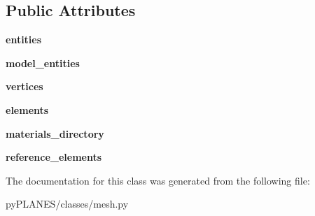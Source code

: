 \subsection*{Public Attributes}
\begin{DoxyCompactItemize}
\item 
\mbox{\label{classpy_p_l_a_n_e_s_1_1classes_1_1mesh_1_1_mesh_ac15122ee911d9b9c915487caa7922cc5}} 
{\bfseries entities}
\item 
\mbox{\label{classpy_p_l_a_n_e_s_1_1classes_1_1mesh_1_1_mesh_aea1bc352a27baadbdaaac62c5bc23ccd}} 
{\bfseries model\+\_\+entities}
\item 
\mbox{\label{classpy_p_l_a_n_e_s_1_1classes_1_1mesh_1_1_mesh_afd1d2275ddbe3ddcad7fcb334e086c46}} 
{\bfseries vertices}
\item 
\mbox{\label{classpy_p_l_a_n_e_s_1_1classes_1_1mesh_1_1_mesh_ac4ee3f9b3a0ceb423f2952f49db2f07e}} 
{\bfseries elements}
\item 
\mbox{\label{classpy_p_l_a_n_e_s_1_1classes_1_1mesh_1_1_mesh_a92837406d5a6161d2931c61cbb2be046}} 
{\bfseries materials\+\_\+directory}
\item 
\mbox{\label{classpy_p_l_a_n_e_s_1_1classes_1_1mesh_1_1_mesh_a07f6b8becc41cf582ec7ff6d07563ea2}} 
{\bfseries reference\+\_\+elements}
\end{DoxyCompactItemize}


The documentation for this class was generated from the following file\+:\begin{DoxyCompactItemize}
\item 
py\+P\+L\+A\+N\+E\+S/classes/mesh.\+py\end{DoxyCompactItemize}
